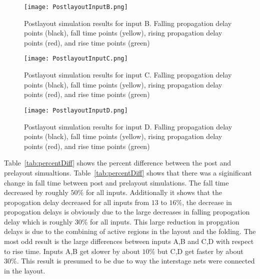 \documentclass[conference]{IEEEtran}
\begin{document}
  \begin{figure}[H]
  \center
    \texttt{[image: PostlayoutInputB.png]}
    \caption{Postlayout simulation results for input B. Falling propagation delay points (black), fall time points (yellow), rising propagation delay points (red), and rise time points (green)}
    \label{fig:PostLayoutBResults}
  \end{figure} 

  \begin{figure}[H]
  \center
    \texttt{[image: PostlayoutInputC.png]}
    \caption{Postlayout simulation results for input C. Falling propagation delay points (black), fall time points (yellow), rising propagation delay points (red), and rise time points (green)}
    \label{fig:PostLayoutCResults}
  \end{figure} 

  \begin{figure}[H]
  \center
    \texttt{[image: PostlayoutInputD.png]}
    \caption{Postlayout simulation results for input D. Falling propagation delay points (black), fall time points (yellow), rising propagation delay points (red), and rise time points (green)}
    \label{fig:PostLayoutDResults}
  \end{figure} 

Table~\ref{tab:percentDiff} shows the percent difference between the post and prelayout simualtions. Table~\ref{tab:percentDiff} shows that there was a siginificant change in fall time between post and prelayout simulations. The fall time decreased by roughly $50\%$ for all inputs. Additionally it shows that the propogation delay decreased for all inputs from $13$ to $16\%$, the decrease in propogation delays is obviously due to the large decreases in falling propogation delay which is roughly $30\%$ for all inputs. This large reduction in propgation delays is due to the combining of active regions in the layout and the folding. The most odd result is the large differences between inputs A,B and C,D with respect to rise time. Inputs A,B get slower by about $10\%$ but C,D get faster by about $30\%$. This result is presumed to be due to way the interstage nets were connected in the layout. 
\end{document}
